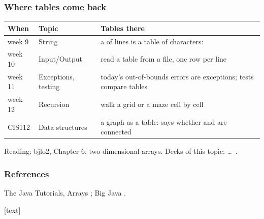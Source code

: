 \documentclass[aspectratio=169,10pt,compress]{beamer}
\begin{document}
\begin{frame}[t,fragile] \frametitle{Where tables come back}


\begin{table}
		\small
		\begin{tabular}{@{}L{0.12\textwidth}L{0.24\textwidth}L{0.56\textwidth}@{}}
			\toprule
			\textbf{When} & \textbf{Topic} & \textbf{Tables there} \\
			\midrule
			week 9  & String              & a  of lines is a table of characters:  \\
			week 10 & Input/Output        & read a table from a file, one row per line \\
			week 11 & Exceptions, testing & today's out-of-bounds errors are exceptions; tests compare tables \\
			week 12 & Recursion           & walk a grid or a maze cell by cell \\
			CIS112  & Data structures     & a graph as a table:  says whether  and  are connected \\
			\bottomrule
		\end{tabular}
\end{table}%


	\vspace{0.3em}
	\small Reading: bjlo2, Chapter 6, two-dimensional arrays. Decks of this topic:  \dots\ .
\end{frame}




\begin{frame}[t,fragile] \frametitle{References}
	\small The Java Tutorials, Arrays \cite{TheJavaTutorialsArray}; Big Java \cite{horstmann2016big}.

	\vspace{1em}
	[text]
	
	\tiny
\end{frame}




\begin{frame}[t,fragile]
	\begin{center}
		\vspace{4cm}
	\end{center}
\end{frame}
\end{document}
